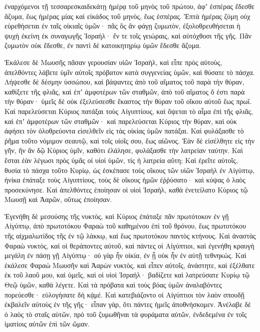 {ἐναρχόμενοι τῇ τεσσαρεσκαιδεκάτῃ ἡμέρᾳ τοῦ μηνὸς τοῦ πρώτου, ἀφʼ ἑσπέρας ἔδεσθε ἄζυμα, ἕως ἡμέρας μίας καὶ εἰκάδος τοῦ μηνὸς, ἕως ἑσπέρας.
Ἑπτὰ ἡμέρας ζύμη οὐχ εὑρεθήσεται ἐν ταῖς οἰκιαῖς ὑμῶν· πᾶς ὃς ἂν φάγῃ ζυμωτὸν, ἐξολοθρευθήσεται ἡ ψυχὴ ἐκείνη ἐκ συναγωγῆς Ἰσραήλ· ἔν τε τοῖς γειώραις, καὶ αὐτόχθοσι τῆς γῆς.
Πᾶν ζυμωτὸν οὐκ ἔδεσθε, ἐν παντὶ δὲ κατοικητηρίῳ ὑμῶν ἔδεσθε ἄζυμα.
\par }{\PP {}Ἐκάλεσε δὲ Μωυσῆς πᾶσαν γερουσίαν υἱῶν Ἰσραὴλ, καὶ εἶπε πρὸς αὐτοὺς, ἀπελθόντες λάβετε ὑμῖν αὐτοῖς πρόβατον κατὰ συγγενείας ὑμῶν, καὶ θύσατε τὸ πάσχα.
Λήψεσθε δὲ δέσμην ὑσσώπου, καὶ βάψαντες ἀπὸ τοῦ αἵματος τοῦ παρὰ τὴν θύραν, καθίξετε τῆς φλιᾶς, καὶ ἐπʼ ἀμφοτέρων τῶν σταθμῶν, ἀπὸ τοῦ αἵματος ὅ ἐστι παρὰ τὴν θύραν· ὑμεῖς δὲ οὐκ ἐξελεύσεσθε ἕκαστος τὴν θύραν τοῦ οἴκου αὐτοῦ ἕως πρωΐ.
Καὶ παρελεύσεται Κύριος πατάξαι τοὺς Αἰγυπτίους, καὶ ὄψεται τὸ αἷμα ἐπὶ τῆς φλιᾶς, καὶ ἐπʼ ἀμφοτέρων τῶν σταθμῶν· καὶ παρελεύσεται Κύριος τὴν θύραν, καὶ οὐκ ἀφήσει τὸν ὀλοθρεύοντα εἰσελθεῖν εἰς τὰς οἰκίας ὑμῶν πατάξαι.
Καὶ φυλάξασθε τὸ ῥῆμα τοῦτο νόμιμον σεαυτῷ, καὶ τοῖς υἱοῖς σου, ἕως αἰῶνος.
Ἐὰν δὲ εἰσέλθητε εἰς τὴν γῆν, ἣν ἂν δῷ Κύριος ὑμῖν, καθότι ἐλάλησε, φυλάξασθε τὴν λατρείαν ταύτην.
Καὶ ἔσται ἐὰν λέγωσι πρὸς ὑμᾶς οἱ υἱοὶ ὑμῶν, τίς ἡ λατρεία αὕτη;
Καὶ ἐρεῖτε αὐτοῖς, θυσία τὸ πάσχα τοῦτο Κυρίῳ, ὡς ἐσκέπασε τοὺς οἴκους τῶν υἱῶν Ἰσραὴλ ἐν Αἰγύπτῳ, ἡνίκα ἐπάταξε τοὺς Αἰγυπτίους, τοὺς δὲ οἴκους ἡμῶν ἐῤῥύσατο· καὶ κύψας ὁ λαὸς προσεκύνησε.
Καὶ ἀπελθόντες ἐποίησαν οἱ υἱοὶ Ἰσραὴλ, καθὰ ἐνετείλατο Κύριος τῷ Μωυσῇ καὶ Ἀαρῶν, οὕτως ἐποίησαν.
\par }{\PP {}Ἐγενήθη δὲ μεσούσης τῆς νυκτὸς, καὶ Κύριος ἐπάταξε πᾶν πρωτότοκον ἐν γῇ Αἰγύπτῳ, ἀπὸ πρωτοτόκου Φαραὼ τοῦ καθημένου ἐπὶ τοῦ θρόνου, ἕως πρωτοτόκου τῆς αἰχμαλωτίδος τῆς ἐν τῷ λάκκῳ, καὶ ἕως πρωτοτόκου παντὸς κτήνους.
Καὶ ἀναστὰς Φαραὼ νυκτὸς, καὶ οἱ θεράποντες αὐτοῦ, καὶ πάντες οἱ Αἰγύπτιοι, καὶ ἐγενήθη κραυγὴ μεγάλη ἐν πάσῃ γῇ Αἰγύπτῳ· οὐ γὰρ ἦν οἰκία, ἐν ᾗ οὐκ ἦν ἐν αὐτῇ τεθνηκώς.
Καὶ ἐκάλεσε Φαραὼ Μωυσῆν καὶ Ἀαρὼν νυκτὸς, καὶ εἶπεν αὐτοῖς, ἀνάστητε, καὶ ἐξέλθατε ἐκ τοῦ λαοῦ μου, καὶ ὑμεῖς, καὶ οἱ υἱοὶ Ἰσραήλ· βαδίζετε καὶ λατρεύσατε Κυρίῳ τῷ Θεῷ ὑμῶν, καθὰ λέγετε.
Καὶ τὰ πρόβατα καὶ τοὺς βόας ὑμῶν ἀναλαβόντες πορεύεσθε· εὐλογήσατε δὴ κᾀμέ.
Καὶ κατεβιάζοντο οἱ Αἰγύπτιοι τὸν λαὸν σπουδῇ ἐκβαλεῖν αὐτοὺς ἐν τῆς γῆς· εἶπαν γὰρ, ὅτι πάντες ἡμεῖς ἀποθνήσκομεν.
Ἀνέλαβε δὲ ὁ λαὸς τὸ σταῖς αὐτῶν, πρὸ τοῦ ζυμωθῆναι τὰ φυράματα αὐτῶν, ἐνδεδεμένα ἐν τοῖς ἱματίοις αὐτῶν ἐπὶ τῶν ὤμαν.
}
